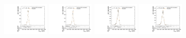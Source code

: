 \begin{figure}[htpb]
  \centering
  \includegraphics[width=0.2\textwidth]{fig/2Dfit/templateVsReco_RadToWW2000_r0_MVV_mu_HP_nobb_LDy_linear.pdf}
  \includegraphics[width=0.2\textwidth]{fig/2Dfit/templateVsReco_RadToWW2000_r0_MVV_mu_LP_nobb_LDy_linear.pdf}
  \includegraphics[width=0.2\textwidth]{fig/2Dfit/templateVsReco_RadToWW2000_r0_MVV_mu_HP_nobb_HDy_linear.pdf}
  \includegraphics[width=0.2\textwidth]{fig/2Dfit/templateVsReco_RadToWW2000_r0_MVV_mu_LP_nobb_HDy_linear.pdf}\\

\end{figure}
